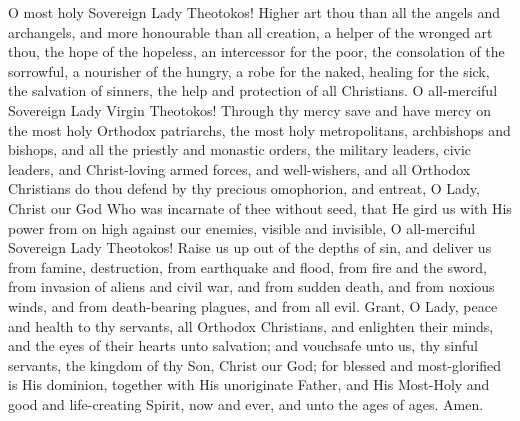 \Priest O most holy Sovereign Lady Theotokos! Higher art thou than all the angels and archangels, and more honourable than all creation, a helper of the wronged art thou, the hope of the hopeless, an intercessor for the poor, the consolation of the sorrowful, a nourisher of the hungry, a robe for the naked, healing for the sick, the salvation of sinners, the help and protection of all Christians. O all-merciful Sovereign Lady Virgin Theotokos! Through thy mercy save and have mercy on the most holy Orthodox patriarchs, the most holy metropolitans, archbishops and bishops, and all the priestly and monastic orders, the military leaders, civic leaders, and Christ-loving armed forces, and well-wishers, and all Orthodox Christians do thou defend by thy precious omophorion, and entreat, O Lady, Christ our God Who was incarnate of thee without seed, that He gird us with His power from on high against our enemies, visible and invisible, O all-merciful Sovereign Lady Theotokos! Raise us up out of the depths of sin, and deliver us from famine, destruction, from earthquake and flood, from fire and the sword, from invasion of aliens and civil war, and from sudden death, and from noxious winds, and from death-bearing plagues, and from all evil. Grant, O Lady, peace and health to thy servants, all Orthodox Christians, and enlighten their minds, and the eyes of their hearts unto salvation; and vouchsafe unto us, thy sinful servants, the kingdom of thy Son, Christ our God; for blessed and most-glorified is His dominion, together with His unoriginate Father, and His Most-Holy and good and life-creating Spirit, now and ever, and unto the ages of ages. Amen.

\pagebreak

